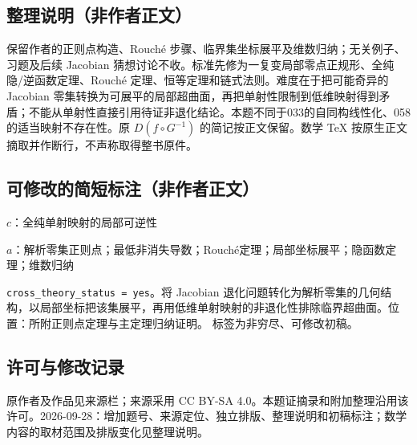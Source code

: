 \documentclass[UTF8,11pt]{ctexart}
\theoremstyle{definition}
\begin{document}
\subsection*{整理说明（非作者正文）}
保留作者的正则点构造、Rouch\'e 步骤、临界集坐标展平及维数归纳；无关例子、习题及后续 Jacobian 猜想讨论不收。标准先修为一复变局部零点正规形、全纯隐/逆函数定理、Rouch\'e 定理、恒等定理和链式法则。难度在于把可能奇异的 Jacobian 零集转换为可展平的局部超曲面，再把单射性限制到低维映射得到矛盾；不能从单射性直接引用待证非退化结论。本题不同于033的自同构线性化、058的适当映射不存在性。原 $D(f\circ G^{-1})$ 的简记按正文保留。数学 TeX 按原生正文摘取并作断行，不声称取得整书原件。
\subsection*{可修改的简短标注（非作者正文）}
$c$：全纯单射映射的局部可逆性

$a$：解析零集正则点；最低非消失导数；Rouché定理；局部坐标展平；隐函数定理；维数归纳

\texttt{cross\_theory\_status = yes}。将 Jacobian 退化问题转化为解析零集的几何结构，以局部坐标把该集展平，再用低维单射映射的非退化性排除临界超曲面。位置：所附正则点定理与主定理归纳证明。
标签为非穷尽、可修改初稿。
\subsection*{许可与修改记录}
原作者及作品见来源栏；来源采用 CC BY-SA 4.0。本题证摘录和附加整理沿用该许可。2026-09-28：增加题号、来源定位、独立排版、整理说明和初稿标注；数学内容的取材范围及排版变化见整理说明。
\end{document}

